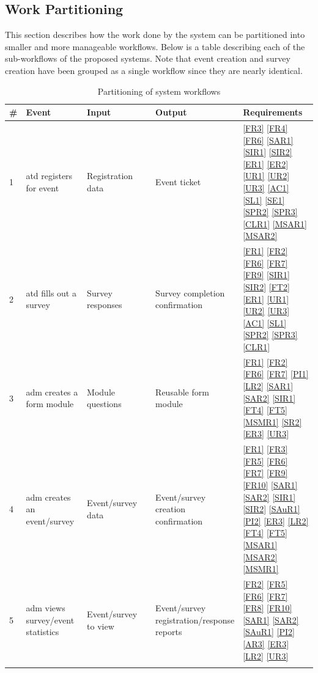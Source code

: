 \documentclass[12pt]{article}
\begin{document}
\subsection{Work Partitioning}

This section describes how the work done by the system can be partitioned into smaller and more manageable workflows.
Below is a table describing each of the sub-workflows of the proposed systems. Note that event creation and survey
creation have been grouped as a single workflow since they are nearly identical.

{
  \setlength{\tabcolsep}{0.2em}
  \renewcommand{\arraystretch}{1.2}
\begin{longtable}[H]{p{0.03\linewidth}p{0.21\linewidth}p{0.25\linewidth}p{0.25\linewidth}p{0.28\linewidth}}
      \textbf{\#} & \textbf{Event} & \textbf{Input} & \textbf{Output} & \textbf{Requirements} \\ \hline
      1 & \Gls{atd} registers for event & Registration data & Event ticket & \ref{FR3} \ref{FR4} \ref{FR6} \ref{SAR1} \ref{SIR1} \ref{SIR2} \ref{ER1} \ref{ER2} \ref{UR1} \ref{UR2} \ref{UR3} \ref{AC1} \ref{SL1} \ref{SE1} \ref{SPR2} \ref{SPR3} \ref{CLR1} \ref{MSAR1} \ref{MSAR2} \\ \hline
      2 & \Gls{atd} fills out a survey & Survey responses & Survey completion confirmation & \ref{FR1} \ref{FR2} \ref{FR6} \ref{FR7} \ref{FR9} \ref{SIR1} \ref{SIR2} \ref{FT2} \ref{ER1} \ref{UR1} \ref{UR2} \ref{UR3} \ref{AC1} \ref{SL1} \ref{SPR2} \ref{SPR3} \ref{CLR1} \\ \hline
      3 & \Gls{adm} creates a form module & Module questions & Reusable form module & \ref{FR1} \ref{FR2} \ref{FR6} \ref{FR7} \ref{PI1} \ref{LR2} \ref{SAR1} \ref{SAR2} \ref{SIR1} \ref{FT4} \ref{FT5} \ref{MSMR1} \ref{SR2} \ref{ER3} \ref{UR3}\\ \hline
      4 & \Gls{adm} creates an event/survey & Event/survey data & Event/survey creation confirmation & \ref{FR1} \ref{FR3} \ref{FR5} \ref{FR6} \ref{FR7} \ref{FR9} \ref{FR10} \ref{SAR1} \ref{SAR2} \ref{SIR1} \ref{SIR2} \ref{SAuR1} \ref{PI2} \ref{ER3} \ref{LR2} \ref{FT4} \ref{FT5} \ref{MSAR1} \ref{MSAR2} \ref{MSMR1}\\ \hline
      5 & \Gls{adm} views survey/event statistics & Event/survey to view & Event/survey registration/response reports & \ref{FR2} \ref{FR5} \ref{FR6} \ref{FR7} \ref{FR8} \ref{FR10} \ref{SAR1} \ref{SAR2} \ref{SAuR1} \ref{PI2} \ref{AR3} \ref{ER3} \ref{LR2} \ref{UR3}
      \\ \hline
    \caption{Partitioning of system workflows}\label{wfpart}
  \end{longtable}
}
\end{document}
